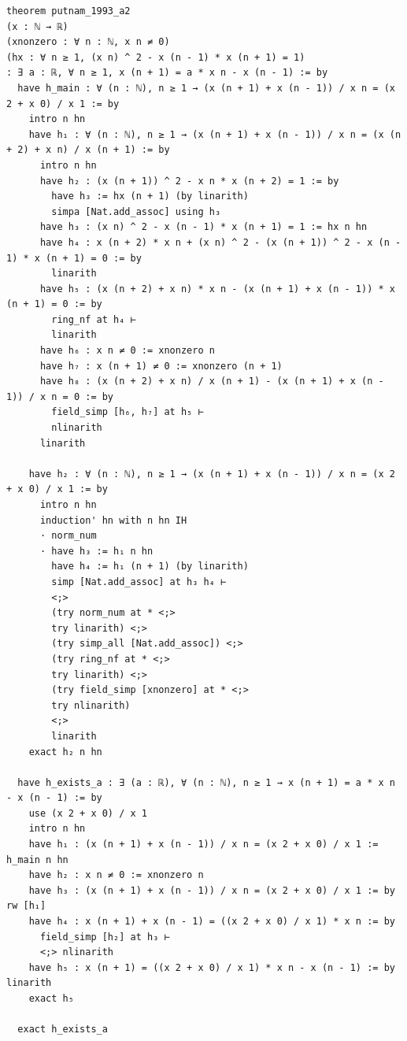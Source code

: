 \begin{tcolorbox}[colback=lightblue, boxrule=0pt, arc=5pt, outer arc=5pt, after skip=10pt plus 2pt]
\begin{lstlisting}[caption={Example of PutnamBench Eval Task (Length 715)},label={lst:putnam-eval-example}, captionpos=t, language=lean, breaklines=true, style=mystyle, belowcaptionskip=0pt]
theorem putnam_1993_a2
(x : ℕ → ℝ)
(xnonzero : ∀ n : ℕ, x n ≠ 0)
(hx : ∀ n ≥ 1, (x n) ^ 2 - x (n - 1) * x (n + 1) = 1)
: ∃ a : ℝ, ∀ n ≥ 1, x (n + 1) = a * x n - x (n - 1) := by 
  have h_main : ∀ (n : ℕ), n ≥ 1 → (x (n + 1) + x (n - 1)) / x n = (x 2 + x 0) / x 1 := by
    intro n hn
    have h₁ : ∀ (n : ℕ), n ≥ 1 → (x (n + 1) + x (n - 1)) / x n = (x (n + 2) + x n) / x (n + 1) := by
      intro n hn
      have h₂ : (x (n + 1)) ^ 2 - x n * x (n + 2) = 1 := by
        have h₃ := hx (n + 1) (by linarith)
        simpa [Nat.add_assoc] using h₃
      have h₃ : (x n) ^ 2 - x (n - 1) * x (n + 1) = 1 := hx n hn
      have h₄ : x (n + 2) * x n + (x n) ^ 2 - (x (n + 1)) ^ 2 - x (n - 1) * x (n + 1) = 0 := by
        linarith
      have h₅ : (x (n + 2) + x n) * x n - (x (n + 1) + x (n - 1)) * x (n + 1) = 0 := by
        ring_nf at h₄ ⊢
        linarith
      have h₆ : x n ≠ 0 := xnonzero n
      have h₇ : x (n + 1) ≠ 0 := xnonzero (n + 1)
      have h₈ : (x (n + 2) + x n) / x (n + 1) - (x (n + 1) + x (n - 1)) / x n = 0 := by
        field_simp [h₆, h₇] at h₅ ⊢
        nlinarith
      linarith
    
    have h₂ : ∀ (n : ℕ), n ≥ 1 → (x (n + 1) + x (n - 1)) / x n = (x 2 + x 0) / x 1 := by
      intro n hn
      induction' hn with n hn IH
      · norm_num
      · have h₃ := h₁ n hn
        have h₄ := h₁ (n + 1) (by linarith)
        simp [Nat.add_assoc] at h₃ h₄ ⊢
        <;>
        (try norm_num at * <;>
        try linarith) <;>
        (try simp_all [Nat.add_assoc]) <;>
        (try ring_nf at * <;>
        try linarith) <;>
        (try field_simp [xnonzero] at * <;>
        try nlinarith)
        <;>
        linarith
    exact h₂ n hn
  
  have h_exists_a : ∃ (a : ℝ), ∀ (n : ℕ), n ≥ 1 → x (n + 1) = a * x n - x (n - 1) := by
    use (x 2 + x 0) / x 1
    intro n hn
    have h₁ : (x (n + 1) + x (n - 1)) / x n = (x 2 + x 0) / x 1 := h_main n hn
    have h₂ : x n ≠ 0 := xnonzero n
    have h₃ : (x (n + 1) + x (n - 1)) / x n = (x 2 + x 0) / x 1 := by rw [h₁]
    have h₄ : x (n + 1) + x (n - 1) = ((x 2 + x 0) / x 1) * x n := by
      field_simp [h₂] at h₃ ⊢
      <;> nlinarith
    have h₅ : x (n + 1) = ((x 2 + x 0) / x 1) * x n - x (n - 1) := by linarith
    exact h₅
  
  exact h_exists_a
\end{lstlisting}
\end{tcolorbox}

